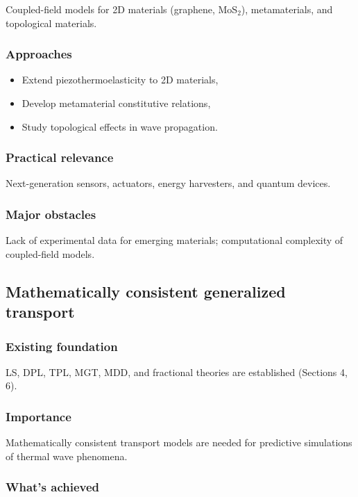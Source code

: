 Coupled-field models for 2D materials (graphene, MoS$_2$), metamaterials, and topological materials.

\subsubsection{Approaches}

\begin{itemize}
\item Extend piezothermoelasticity to 2D materials,
\item Develop metamaterial constitutive relations,
\item Study topological effects in wave propagation.
\end{itemize}

\subsubsection{Practical relevance}

Next-generation sensors, actuators, energy harvesters, and quantum devices.

\subsubsection{Major obstacles}

Lack of experimental data for emerging materials; computational complexity of coupled-field models.

\subsection{Mathematically consistent generalized transport}
\label{sec:16.2}

\subsubsection{Existing foundation}

LS, DPL, TPL, MGT, MDD, and fractional theories are established (Sections 4, 6).

\subsubsection{Importance}

Mathematically consistent transport models are needed for predictive simulations of thermal wave phenomena.

\subsubsection{What's achieved}

